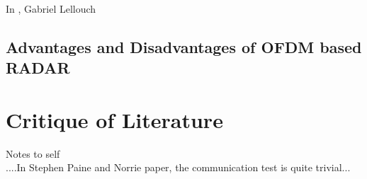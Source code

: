 \documentclass[class=report,11pt,crop=false]{standalone}
\begin{document}
In \cite{lellouch_waveform_2015}, Gabriel Lellouch




\subsection{Advantages and Disadvantages of OFDM based RADAR}




\section{Critique of Literature}
Notes to self \\
....In Stephen Paine and Norrie paper, the communication test is quite trivial...


\ifstandalone

\printnoidxglossary[type=\acronymtype,nonumberlist]
\fi
\end{document}
